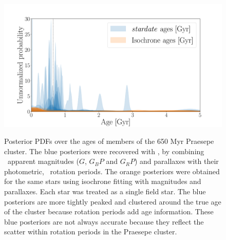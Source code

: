 \begin{figure}
  \caption{
Posterior PDFs over the ages of members of the 650 Myr Praesepe cluster.
The blue posteriors were recovered with \sd, by combining \gaia\ apparent
    magnitudes ($G$, $G_BP$ and $G_RP$) and parallaxes with their photometric,
    \ktwo\ rotation periods.
The orange posteriors were obtained for the same stars using isochrone fitting
    with \gaia magnitudes and parallaxes.
Each star was treated as a single field star.
The blue posteriors are more tightly peaked and clustered around the true age
of the cluster because rotation periods add age information.
These blue posteriors are not always accurate because they reflect the scatter
within rotation periods in the Praesepe cluster.
}
  \centering
    \includegraphics[width=1\textwidth]{praesepe_results}
\label{fig:praesepe_results}
\end{figure}

